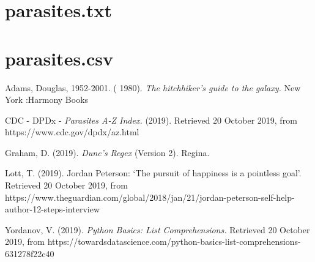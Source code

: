 \documentclass[journal,onecolumn]{IEEEtran}
\begin{document}
\newpage

\section{parasites.txt}
\label{app1}
\lstset{basicstyle=\small}


\newpage

\section{parasites.csv}
\label{app1}
\lstset{basicstyle=\ttfamily \small}


\newpage

\begin{thebibliography}{1}


Adams, Douglas, 1952-2001. ( 1980). \emph{The hitchhiker's guide to the galaxy.} New York :Harmony Books

CDC - DPDx - \emph{Parasites A-Z Index.} (2019). Retrieved 20 October 2019, from https://www.cdc.gov/dpdx/az.html

Graham, D. (2019). \emph{Dunc's Regex} (Version 2). Regina.

Lott, T. (2019). Jordan Peterson: ‘The pursuit of happiness is a pointless goal’. Retrieved 20 October 2019, from https://www.theguardian.com/global/2018/jan/21/jordan-peterson-self-help-author-12-steps-interview

Yordanov, V. (2019). \emph{Python Basics: List Comprehensions.} Retrieved 20 October 2019, from https://towardsdatascience.com/python-basics-list-comprehensions-631278f22c40

\end{thebibliography}

\end{document}
